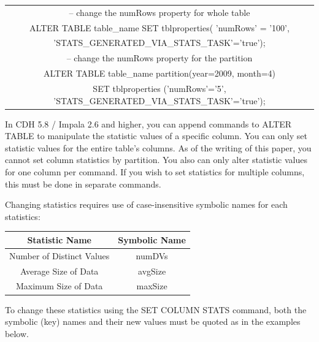 \documentclass[onecolumn, draftclsnofoot,10pt, compsoc]{IEEEtran}
\begin{document}
\begin{center}
\begin{tabular}{ |c| }
    \hline
    -- change the numRows property for whole table \\
    ALTER TABLE table\_name SET tblproperties( 'numRows' = '100', \\ 'STATS\_GENERATED\_VIA\_STATS\_TASK'='true'); \\

    -- change the numRows property for the partition \\
    ALTER TABLE table\_name partition(year=2009, month=4) \\
    SET tblproperties ('numRows'='5', 'STATS\_GENERATED\_VIA\_STATS\_TASK'='true'); \\
    \hline
\end{tabular}
\end{center}

In CDH 5.8 / Impala 2.6 and higher, you can append commands to ALTER TABLE to manipulate the statistic values of a specific column.
You can only set statistic values for the entire table’s columns. 
As of the writing of this paper,  you cannot set column statistics by partition.
You also can only alter statistic values for one column per command.
If you wish to set statistics for multiple columns, this must be done in separate commands. 

Changing statistics requires use of case-insensitive symbolic names for each statistics:
\begin{center}
\begin{tabular}{ |c|c| }
    \hline
    Statistic Name & Symbolic Name \\
    \hline
    Number of Distinct Values & numDVs \\ 
    \hline
    Average Size of Data & avgSize \\
    \hline
    Maximum Size of Data & maxSize \\
    \hline
\end{tabular}
\end{center}

To change these statistics using the SET COLUMN STATS command, both the symbolic (key) names and their new values must be quoted as in the examples below.
\end{document}
